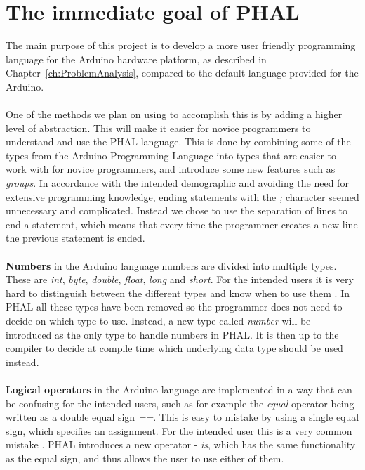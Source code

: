 \section{The immediate goal of PHAL}\label{sec:phalvsarduino}
The main purpose of this project is to develop a more user friendly programming language for the Arduino hardware platform, as described in Chapter~\ref{ch:ProblemAnalysis}, compared to the default language provided for the Arduino. 
\\\\
One of the methods we plan on using to accomplish this is by adding a higher level of abstraction. This will make it easier for novice programmers to understand and use the PHAL language. 
This is done by combining some of the types from the Arduino Programming Language into types that are easier to work with for novice programmers, and introduce some new features such as \textit{groups}. 
In accordance with the intended demographic and avoiding the need for extensive programming knowledge, ending statements with the \textit{;} character seemed unnecessary and complicated. 
Instead we chose to use the separation of lines to end a statement, which means that every time the programmer creates a new line the previous statement is ended.
\\\\
\textbf{Numbers} in the Arduino language numbers are divided into multiple types. 
These are \textit{int}, \textit{byte}, \textit{double}, \textit{float}, \textit{long} and \textit{short}. 
For the intended users it is very hard to distinguish between the different types and know when to use them \cite{FiveCommonArduinoMistakes}. 
In PHAL all these types have been removed so the programmer does not need to decide on which type to use. 
Instead, a new type called \textit{number} will be introduced as the only type to handle numbers in PHAL. 
It is then up to the compiler to decide at compile time which underlying data type should be used instead.
\\\\
\textbf{Logical operators} in the Arduino language are implemented in a way that can be confusing for the intended users, such as for example the \textit{equal} operator being written as a double equal sign \textit{==}. 
This is easy to mistake by using a single equal sign, which specifies an assignment. 
For the intended user this is a very common mistake \cite{FiveCommonArduinoMistakes}. 
PHAL introduces a new operator - \textit{is}, which has the same functionality as the equal sign, and thus allows the user to use either of them.
